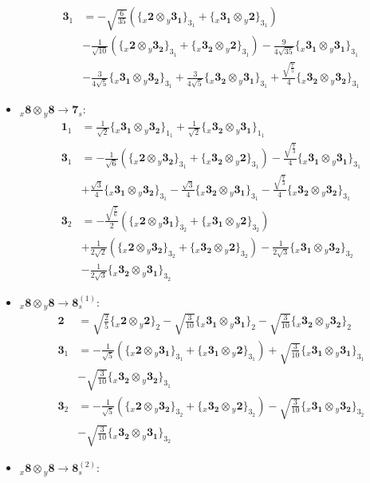 \documentclass[english]{article}
\newcommand{\rep}[1]{\mathbf{#1}}
\newcommand{\repx}[2]{{}_{#2}\mathbf{#1}}
\newcommand{\tsprodx}[2]{\repx{#1}{x}\otimes\repx{#2}{y}}
\newcommand{\subcgs}[3]{\big\{ \tsprodx{#1}{#2}\big\}^{}_{#3}}
\begin{document}
\begin{itemize}
\begin{align*}
\\
\rep{3}_{1} & = -\sqrt{\frac{6}{35}}\left(\subcgs{2}{3_{1}}{3_{1}}+\subcgs{3_{1}}{2}{3_{1}}\right) \\ 
 & -\frac{1}{\sqrt{10}}\left(\subcgs{2}{3_{2}}{3_{1}}+\subcgs{3_{2}}{2}{3_{1}}\right)-\frac{9}{4 \sqrt{35}}\subcgs{3_{1}}{3_{1}}{3_{1}} \\ 
 & -\frac{3}{4 \sqrt{5}}\subcgs{3_{1}}{3_{2}}{3_{1}}+\frac{3}{4 \sqrt{5}}\subcgs{3_{2}}{3_{1}}{3_{1}}+\frac{\sqrt{\frac{7}{5}}}{4}\subcgs{3_{2}}{3_{2}}{3_{1}}
\end{align*}
\item $\tsprodx{8}{8}\to\rep{7}_{s}$:
\begin{align*}
\rep{1}_{1} & = \frac{1}{\sqrt{2}}\subcgs{3_{1}}{3_{2}}{1_{1}}+\frac{1}{\sqrt{2}}\subcgs{3_{2}}{3_{1}}{1_{1}}
\\
\rep{3}_{1} & = -\frac{1}{\sqrt{6}}\left(\subcgs{2}{3_{2}}{3_{1}}+\subcgs{3_{2}}{2}{3_{1}}\right)-\frac{\sqrt{\frac{7}{3}}}{4}\subcgs{3_{1}}{3_{1}}{3_{1}} \\ 
 & +\frac{\sqrt{3}}{4}\subcgs{3_{1}}{3_{2}}{3_{1}}-\frac{\sqrt{3}}{4}\subcgs{3_{2}}{3_{1}}{3_{1}}-\frac{\sqrt{\frac{7}{3}}}{4}\subcgs{3_{2}}{3_{2}}{3_{1}}
\\
\rep{3}_{2} & = -\frac{\sqrt{\frac{7}{6}}}{2}\left(\subcgs{2}{3_{1}}{3_{2}}+\subcgs{3_{1}}{2}{3_{2}}\right) \\ 
 & +\frac{1}{2 \sqrt{2}}\left(\subcgs{2}{3_{2}}{3_{2}}+\subcgs{3_{2}}{2}{3_{2}}\right)-\frac{1}{2 \sqrt{3}}\subcgs{3_{1}}{3_{2}}{3_{2}} \\ 
 & -\frac{1}{2 \sqrt{3}}\subcgs{3_{2}}{3_{1}}{3_{2}}
\end{align*}
\item $\tsprodx{8}{8}\to\rep{8}_{s}^{(1)}$:
\begin{align*}
\rep{2} & = \sqrt{\frac{2}{5}}\subcgs{2}{2}{2}-\sqrt{\frac{3}{10}}\subcgs{3_{1}}{3_{1}}{2}-\sqrt{\frac{3}{10}}\subcgs{3_{2}}{3_{2}}{2}
\\
\rep{3}_{1} & = -\frac{1}{\sqrt{5}}\left(\subcgs{2}{3_{1}}{3_{1}}+\subcgs{3_{1}}{2}{3_{1}}\right)+\sqrt{\frac{3}{10}}\subcgs{3_{1}}{3_{1}}{3_{1}} \\ 
 & -\sqrt{\frac{3}{10}}\subcgs{3_{2}}{3_{2}}{3_{1}}
\\
\rep{3}_{2} & = -\frac{1}{\sqrt{5}}\left(\subcgs{2}{3_{2}}{3_{2}}+\subcgs{3_{2}}{2}{3_{2}}\right)-\sqrt{\frac{3}{10}}\subcgs{3_{1}}{3_{2}}{3_{2}} \\ 
 & -\sqrt{\frac{3}{10}}\subcgs{3_{2}}{3_{1}}{3_{2}}
\end{align*}
\item $\tsprodx{8}{8}\to\rep{8}_{s}^{(2)}$:

\end{itemize}
\end{document}
